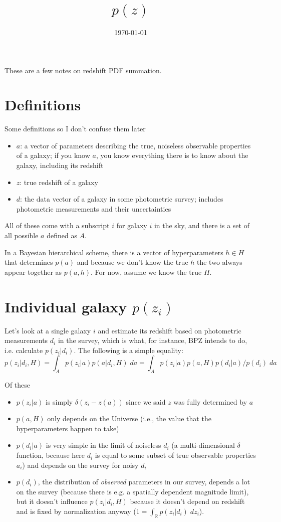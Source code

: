 \documentclass[11pt]{amsart}
\title{$p(z)$}
\date{\today}                                           %
\begin{document}
\maketitle

These are a few notes on redshift PDF summation.

\section{Definitions}

Some definitions so I don't confuse them later
\begin{itemize}
\item $a$: a vector of parameters describing the true, noiseless observable properties of a galaxy; if you know $a$, you know everything there is to know about the galaxy, including its redshift
\item $z$: true redshift of a galaxy 
\item $d$: the data vector of a galaxy in some photometric survey; includes photometric measurements and their uncertainties
\end{itemize}
All of these come with a subscript $i$ for galaxy $i$ in the sky, and there is a set of all possible $a$ defined as $A$. 

In a Bayesian hierarchical scheme, there is a vector of hyperparameters $h\in H$ that determines $p(a)$ and because we don't know the true $h$ the two always appear together as $p(a,h)$. For now, assume we know the true $H$.
\section{Individual galaxy $p(z_i)$}

Let's look at a single galaxy $i$ and estimate its redshift based on photometric measurements $d_i$ in the survey, which is what, for instance, BPZ intends to do, i.e. calculate $p(z_i|d_i)$. The following is a simple equality:
\begin{equation}
p(z_i|d_i, H)=\int_{A} p(z_i|a) p(a|d_i, H) \; da = \int_{A} p(z_i|a) p(a, H) p(d_i|a) / p(d_i) \; da
\end{equation}

Of these
\begin{itemize}
\item $p(z_i|a)$ is simply $\delta(z_i-z(a))$ since we said $z$ was fully determined by $a$ 
\item $p(a, H)$ only depends on the Universe (i.e., the value that the hyperparameters happen to take)
\item $p(d_i|a)$ is very simple in the limit of noiseless $d_i$ (a multi-dimensional $\delta$ function, because here $d_i$ is equal to some subset of true observable properties $a_i$) and depends on the survey for noisy $d_i$
\item $p(d_i)$, the distribution of \emph{observed} parameters in our survey, depends a lot on the survey (because there is e.g. a spatially dependent magnitude limit), but it doesn't influence $p(z_i|d_i, H)$ because it doesn't depend on redshift and is fixed by normalization anyway ($1=\int_{\mathbb{R}} p(z_i|d_i)\; dz_i$).
\end{itemize}
\end{document}
